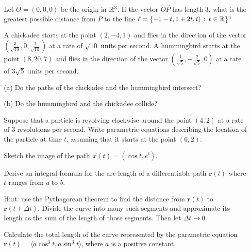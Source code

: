 \documentclass[svgnames]{watsonbook}
\begin{document}
\begin{aexercise}
  Let $O=(0,0,0)$ be the origin in $\mathbb{R}^3$. If the vector
  $\overrightarrow{OP}$ has length 3, what is the greatest possible
  distance from $P$ to the line
  $\ell = \{-1-t,1+2t,t) \,:\, t\in \mathbb{R}$\}?
\end{aexercise}


\begin{aexercise}
A chickadee starts at the point $(2,-4,1)$ and flies in the direction of the vector $\left(\frac{3}{\sqrt{10}},0,\frac{1}{\sqrt{10}}\right)$ at a rate of $\sqrt{10}$ units per second. A hummingbird starts at the point $(8,20,7)$ and flies in the direction of the vector $\left(\frac{1}{\sqrt{5}},-\frac{2}{\sqrt{5}},0\right)$ at a rate of $3\sqrt{5}$ units per second.

(a) Do the paths of the chickadee and the hummingbird intersect? 

(b) Do the hummingbird and the chickadee collide?
\end{aexercise}

\begin{aexercise}
  Suppose that a particle is revolving clockwise around the point
  $(4,2)$ at a rate of 3 revolutions per second. Write parametric
  equations describing the location of the particle at time $t$,
  assuming that it starts at the point $(6,2)$.
\end{aexercise}

\begin{aexercise}
  Sketch the image of the path $\vec{x}(t)=(\cos t, e^t)$.
\end{aexercise}

\begin{aexercise}
  Derive an integral formula for the arc length of a differentiable
  path $\mathbf{r}(t)$ where $t$ ranges from $a$ to $b$.

  Hint: use the Pythagorean theorem to find the distance from
  $\mathbf{r}(t)$ to $\mathbf{r}(t+\Delta t)$. Divide the curve into
  many such segments and approximate its length as the sum of the
  length of those segments. Then let $\Delta t \to 0$. 
\end{aexercise}

\begin{aexercise}
  Calculate the total length of the curve represented by the
  parametric equation $\mathbf{r}(t) = \langle a\cos^3t, a\sin^3 t \rangle$,
  where $a$ is a positive constant.
\end{aexercise}
\end{document}
